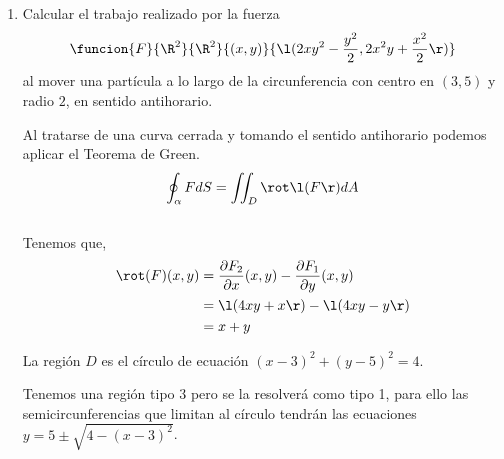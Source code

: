\documentclass[a4,11pt]{aleph-examen}
\begin{document}
\begin{preguntas}
\begin{respuesta}
\begin{respuesta}
\begin{respuesta}
\begin{enumerate}
\begin{respuesta}
Al tratarse de una curva cerrada y tomando el sentido antihorario podemos aplicar el Teorema de Green:
	\[
    \oint_\alpha f dS=\iint_D \rot \l(f\r) dA
    \]
\\    
Tenemos que,
	\[
    \begin{aligned}
    \rot(f)(x,y)&=\dfrac{\partial f_2}{\partial x}(x,y)-\dfrac{\partial f_1}{\partial y}(x,y)\\
    	  &=2xy^3-x
    \end{aligned}
    \]
La región $D$ es de tipo 3, y se la resolverá como tipo 1. Se divide a $D$ en dos intervalos.    

	\[
    \begin{aligned}
    \iint_D \rot \l(f\r) dA &=\int_1^2 \int_{\frac{3}{2}-\frac{1}{2}x}^{x} \l(2xy^3-x\r) dydx + \int_2^3 \int_{\frac{3}{2}-\frac{1}{2}x}^{6-2x} \l(2xy^3-x\r) dydx\\
    &\approx3.747 + 1.703\\
    &\approx5.45
    \end{aligned}
    \]
\end{respuesta}

\item Calcular el trabajo realizado por la fuerza 
		\[
        	\funcion{F}{\R^2}{\R^2}{(x,y)}{\l(2xy^2-\dfrac{y^2}{2}, 2x^2y+\dfrac{x^2}{2}\r)} 
        \]
al mover una partícula a lo largo de la circunferencia con centro en $(3,5)$ y radio $2$, en sentido antihorario.

\begin{respuesta}
Al tratarse de una curva cerrada y tomando el sentido antihorario podemos aplicar el Teorema de Green.
	\[
    \oint_\alpha F dS=\iint_D \rot \l(F\r) dA
    \]
\\    
Tenemos que,
	\[
    \begin{aligned}
    \rot(F)(x,y)&=\dfrac{\partial F_2}{\partial x}(x,y)-\dfrac{\partial F_1}{\partial y}(x,y)\\
    	  &=\l(4xy+x\r)-\l(4xy-y\r)\\
          &=x+y
    \end{aligned}
    \]
    
La región $D$ es el círculo de ecuación $(x-3)^2+(y-5)^2=4$.

\begin{center}
\end{center}
Tenemos una región tipo 3 pero se la resolverá como tipo 1, para ello las semicircunferencias que limitan al círculo tendrán las ecuaciones $y=5\pm \sqrt{4-(x-3)^2}$.


\end{respuesta}
\end{enumerate}
\end{respuesta}
\end{respuesta}
\end{respuesta}
\end{preguntas}
\end{document}
